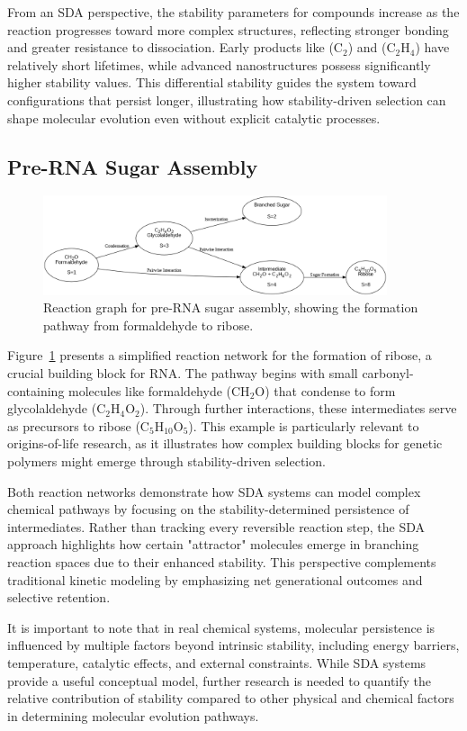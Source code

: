 \documentclass[preprint,12pt]{elsarticle}
\begin{document}
From an SDA perspective, the stability parameters for compounds increase as the reaction progresses toward more complex structures, reflecting stronger bonding and greater resistance to dissociation. Early products like (\( \text{C}_2 \)) and (\( \text{C}_2\text{H}_4 \)) have relatively short lifetimes, while advanced nanostructures possess significantly higher stability values. This differential stability guides the system toward configurations that persist longer, illustrating how stability-driven selection can shape molecular evolution even without explicit catalytic processes.

\subsection{Pre-RNA Sugar Assembly}

\begin{figure}[h]
    \centering
    \includegraphics[width=0.9\textwidth]{figure_8.png}
    \caption{Reaction graph for pre-RNA sugar assembly, showing the formation pathway from formaldehyde to ribose.}
    \label{fig:figure_8}
\end{figure}

Figure~\ref{fig:figure_8} presents a simplified reaction network for the formation of ribose, a crucial building block for RNA. The pathway begins with small carbonyl-containing molecules like formaldehyde (CH$_2$O) that condense to form glycolaldehyde (C$_2$H$_4$O$_2$). Through further interactions, these intermediates serve as precursors to ribose (C$_5$H$_{10}$O$_5$). This example is particularly relevant to origins-of-life research, as it illustrates how complex building blocks for genetic polymers might emerge through stability-driven selection.

Both reaction networks demonstrate how SDA systems can model complex chemical pathways by focusing on the stability-determined persistence of intermediates. Rather than tracking every reversible reaction step, the SDA approach highlights how certain "attractor" molecules emerge in branching reaction spaces due to their enhanced stability. This perspective complements traditional kinetic modeling by emphasizing net generational outcomes and selective retention.

It is important to note that in real chemical systems, molecular persistence is influenced by multiple factors beyond intrinsic stability, including energy barriers, temperature, catalytic effects, and external constraints. While SDA systems provide a useful conceptual model, further research is needed to quantify the relative contribution of stability compared to other physical and chemical factors in determining molecular evolution pathways.
\end{document}
